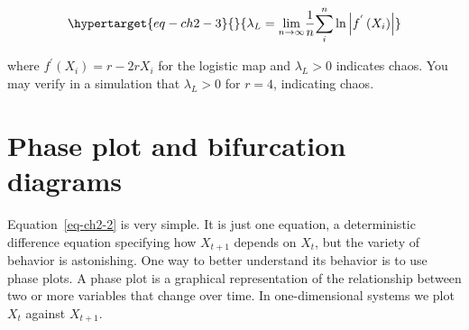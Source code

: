 \documentclass[
  a4paper,
  DIV=11,
  numbers=noendperiod,
  oneside]{scrreprt}
\begin{document}
\begin{equation}\protect\hypertarget{eq-ch2-3}{}{
{\lambda_{L} = \lim_{n \rightarrow \infty}}{\frac{1}{n}}{\sum_{i}^{n}{\ln\left| f^{'}\left( X_{i} \right) \right|}}}\label{eq-ch2-3}\end{equation}

where \(f^{'}\left( X_{i} \right) = r - 2rX_{i}\) for the logistic map
and \(\lambda_{L} > 0\) indicates chaos. You may verify in a simulation
that \(\lambda_{L} > 0\) for \(r = 4\), indicating chaos.

\hypertarget{sec-Phase-plot-and-bifurcation-diagrams}{%
\section{Phase plot and bifurcation
diagrams}\label{sec-Phase-plot-and-bifurcation-diagrams}}

Equation~\ref{eq-ch2-2} is very simple. It is just one equation, a
deterministic difference equation specifying how \(X_{t + 1}\) depends
on \(X_{t}\), but the variety of behavior is astonishing. One way to
better understand its behavior is to use phase plots. A phase plot is a
graphical representation of the relationship between two or more
variables that change over time. In one-dimensional systems we plot
\(X_{t}\) against \(X_{t + 1}\).
\end{document}
